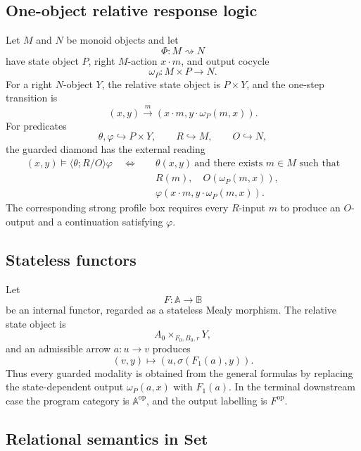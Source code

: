 \subsection{One-object relative response logic}
\label{subsec:dynamic-one-object-response-logic}

Let \(M\) and \(N\) be monoid objects and let
\[
    \Phi:M\rightsquigarrow N
\]
have state object \(P\), right \(M\)-action \(x\cdot m\), and output cocycle
\[
    \omega_P:M\times P\to N.
\]
For a right \(N\)-object \(Y\), the relative state object is \(P\times Y\),
and the one-step transition is
\[
    (x,y)\xrightarrow{m}
    \left(
        x\cdot m,
        y\cdot\omega_P(m,x)
    \right).
\]
For predicates
\[
    \theta,\varphi\hookrightarrow P\times Y,
    \qquad
    R\hookrightarrow M,
    \qquad
    O\hookrightarrow N,
\]
the guarded diamond has the external reading
\[
\begin{aligned}
(x,y)\models\langle\theta;R/O\rangle\varphi
\quad\Longleftrightarrow\quad&
\theta(x,y)\ \text{and there exists }m\in M\text{ such that}\\
&
R(m),\quad O(\omega_P(m,x)),\\
&
\varphi\!\left(
x\cdot m,
y\cdot\omega_P(m,x)
\right).
\end{aligned}
\]
The corresponding strong profile box requires every \(R\)-input \(m\) to
produce an \(O\)-output and a continuation satisfying \(\varphi\).

\subsection{Stateless functors}
\label{subsec:dynamic-stateless-response-logic}

Let
\[
    F:\mathbb A\to\mathbb B
\]
be an internal functor, regarded as a stateless Mealy morphism.  The relative
state object is
\[
    A_0\times_{F_0,B_0,r}Y,
\]
and an admissible arrow \(a:u\to v\) produces
\[
    (v,y)\longmapsto
    \left(
        u,
        \sigma(F_1(a),y)
    \right).
\]
Thus every guarded modality is obtained from the general formulas by replacing
the state-dependent output \(\omega_P(a,x)\) with \(F_1(a)\).  In the terminal
downstream case the program category is
\(\mathbb A^{\mathrm{op}}\), and the output labelling is
\(F^{\mathrm{op}}\).

\subsection{Relational semantics in \(\mathbf{Set}\)}
\label{subsec:dynamic-relational-set-semantics}

